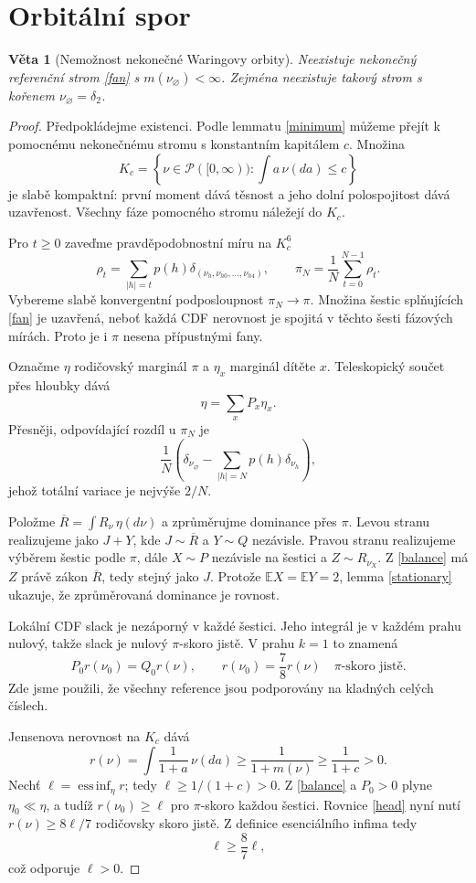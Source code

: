 \documentclass[11pt,a4paper]{article}
\newtheorem{theorem}{Věta}
\newcommand{\E}{\mathbb E}
\begin{document}
\section{Orbitální spor}
\begin{theorem}[Nemožnost nekonečné Waringovy orbity]\label{main}
Neexistuje nekonečný referenční strom \eqref{fan} s
$m(\nu_\varnothing)<\infty$. Zejména neexistuje takový strom
s kořenem $\nu_\varnothing=\delta_2$.
\end{theorem}
\begin{proof}
Předpokládejme existenci. Podle lemmatu \ref{minimum} můžeme
přejít k pomocnému nekonečnému stromu s konstantním kapitálem $c$.
Množina
\[
K_c=\left\{\nu\in\mathcal P([0,\infty)):
\int a\,\nu(da)\le c\right\}
\]
je slabě kompaktní: první moment dává těsnost a jeho dolní
polospojitost dává uzavřenost. Všechny fáze pomocného stromu
náležejí do $K_c$.

Pro $t\ge0$ zaveďme pravděpodobnostní míru na $K_c^6$
\[
\rho_t=\sum_{|h|=t}p(h)
\delta_{(\nu_h,\nu_{h0},\ldots,\nu_{h4})},\qquad
\pi_N=\frac1N\sum_{t=0}^{N-1}\rho_t.
\]
Vybereme slabě konvergentní podposloupnost $\pi_N\to\pi$.
Množina šestic splňujících \eqref{fan} je uzavřená, neboť každá
CDF nerovnost je spojitá v těchto šesti fázových mírách. Proto je
i $\pi$ nesena přípustnými fany.

Označme $\eta$ rodičovský marginál $\pi$ a $\eta_x$ marginál
dítěte $x$. Teleskopický součet přes hloubky dává
\begin{equation}\label{balance}
\boxed{\eta=\sum_xP_x\eta_x.}
\end{equation}
Přesněji, odpovídající rozdíl u $\pi_N$ je
\[
\frac1N\left(\delta_{\nu_\varnothing}
-\sum_{|h|=N}p(h)\delta_{\nu_h}\right),
\]
jehož totální variace je nejvýše $2/N$.

Položme $\overline R=\int R_\nu\,\eta(d\nu)$ a zprůměrujme
dominance přes $\pi$. Levou stranu realizujeme jako $J+Y$, kde
$J\sim\overline R$ a $Y\sim Q$ nezávisle. Pravou stranu
realizujeme výběrem šestic podle $\pi$, dále $X\sim P$ nezávisle
na šestici a $Z\sim R_{\nu_X}$. Z \eqref{balance} má $Z$ právě
zákon $\overline R$, tedy stejný jako $J$.
Protože $\E X=\E Y=2$, lemma \ref{stationary} ukazuje, že
zprůměrovaná dominance je rovnost.

Lokální CDF slack je nezáporný v každé šestici. Jeho integrál je
v každém prahu nulový, takže slack je nulový $\pi$-skoro jistě.
V prahu $k=1$ to znamená
\begin{equation}\label{head}
P_0r(\nu_0)=Q_0r(\nu),\qquad
r(\nu_0)=\frac78r(\nu)
\quad\pi\text{-skoro jistě}.
\end{equation}
Zde jsme použili, že všechny reference jsou podporovány na
kladných celých číslech.

Jensenova nerovnost na $K_c$ dává
\[
r(\nu)=\int\frac1{1+a}\,\nu(da)
\ge\frac1{1+m(\nu)}\ge\frac1{1+c}>0.
\]
Nechť $\ell=\operatorname*{ess\,inf}_{\eta}r$; tedy
$\ell\ge1/(1+c)>0$.
Z \eqref{balance} a $P_0>0$ plyne $\eta_0\ll\eta$, a tudíž
$r(\nu_0)\ge\ell$ pro $\pi$-skoro každou šestici.
Rovnice \eqref{head} nyní nutí $r(\nu)\ge8\ell/7$ rodičovsky
skoro jistě. Z definice esenciálního infima tedy
\[
\ell\ge\frac87\ell,
\]
což odporuje $\ell>0$.
\end{proof}
\end{document}
